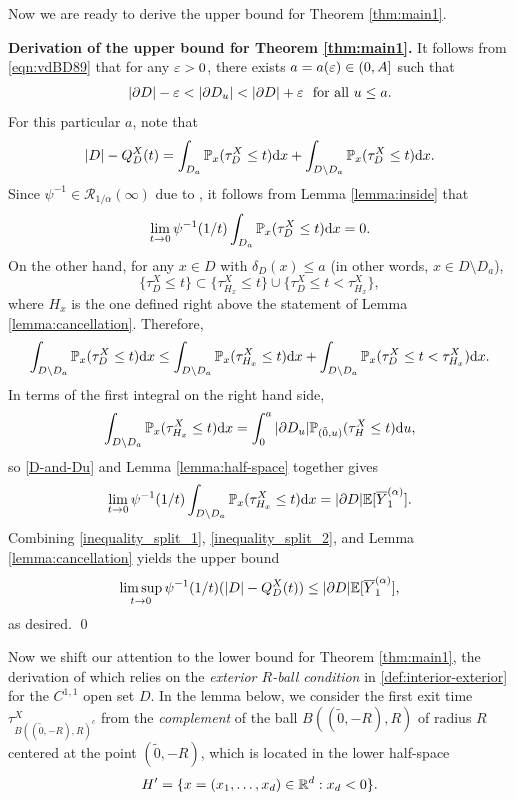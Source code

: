 \documentclass[11pt]{article}
\begin{document}
\begin{doublespace}
Now we are ready to derive the upper bound for Theorem \ref{thm:main1}. \bigskip

\noindent
\textbf{Derivation of the upper bound for Theorem \ref{thm:main1}.}
It follows from \eqref{eqn:vdBD89} that for any $\varepsilon>0$, there exists $a=a(\varepsilon)\in (0,A]$ such that 
\begin{align}\label{D-and-Du}
	|\partial D| - \eps < |\partial D_{u}|<|\partial D| +\eps \ \ \textrm{for all} \ u\leq a.
\end{align}
For this particular $a$, note that
\[
|D|-Q_{D}^{X}(t)=\int_{D_{a}}{\mathbb P}_{x}(\tau_{D}^{X}\leq t)\mathrm{d} x +\int_{D\setminus D_{a}}{\mathbb P}_{x}(\tau_{D}^{X}\leq t)\mathrm{d} x.
\]
Since $\psi^{-1}\in \mathcal{R}_{1/\alpha}(\infty)$ due to \cite[Theorems 1.5.3 and 1.5.12]{BGT}, it follows from Lemma \ref{lemma:inside} that 
\[
\lim_{t\to 0}\psi^{-1}(1/t)\int_{D_{a}}{\mathbb P}_{x}(\tau_{D}^{X}\leq t)\mathrm{d} x=0.
\]
On the other hand, for any $x\in D$ with $\delta_{D}(x)\le a$ (in other words, $x\in D\setminus D_a$), 
\[
\{\tau_{D}^{X}\leq t\}\subset \{\tau^{X}_{H_x}\leq t\} \cup \{\tau_{D}^{X}\leq t <\tau_{H_x}^{X}\},
\]
where $H_x$ is the one defined right above the statement of Lemma \ref{lemma:cancellation}.
Therefore,
\begin{align}\label{inequality_split_1}
\int_{D\setminus D_{a}}{\mathbb P}_{x}(\tau_{D}^{X}\leq t)\mathrm{d} x \leq 
\int_{D\setminus D_{a}}{\mathbb P}_{x}(\tau_{H_x}^{X}\leq t)\mathrm{d} x
+\int_{D\setminus D_{a}}{\mathbb P}_{x}(\tau_{D}^{X}\leq t <\tau_{H_x}^{X})\mathrm{d} x.
\end{align} 
In terms of the first integral on the right hand side, 
\[
	\int_{D\setminus D_{a}}{\mathbb P}_{x}(\tau_{H_x}^{X}\leq t)\mathrm{d} x
	=\int_{0}^{a}|\partial D_{u}|{\mathbb P}_{(\tilde{0}, u)}(\tau_{H}^{X}\leq t)\mathrm{d} u, 
\]
so \eqref{D-and-Du} and Lemma \ref{lemma:half-space} together gives
\begin{align}\label{inequality_split_2}
\lim_{t\to 0}\psi^{-1}(1/t)\int_{D\setminus D_{a}}{\mathbb P}_{x}(\tau_{H_x}^{X}\leq t)\mathrm{d} x=|\partial D|{\mathbb E}[\overline{Y}^{(\alpha)}_{1}].
\end{align}
Combining \eqref{inequality_split_1}, \eqref{inequality_split_2}, and Lemma \ref{lemma:cancellation} yields the upper bound
\[
\limsup_{t\to0}\psi^{-1}(1/t)(|D|-Q_{D}^{X}(t))\leq |\partial D|{\mathbb E}[\overline{Y}^{(\alpha)}_{1}],
\]
as desired.
\qed


Now we shift our attention to the lower bound for Theorem \ref{thm:main1}, the derivation of which relies on the
\textit{exterior $R$-ball condition} in \eqref{def:interior-exterior}
for the $C^{1,1}$ open set $D$. 
In the lemma below, we consider the first exit time $\tau^{X}_{B((\tilde{0},-R),R)^{c}}$ from the \textit{complement} of the ball $B((\tilde{0},-R),R)$ of radius $R$ centered at the point $(\tilde{0},-R)$, which is located in the lower half-space 
\[
	H'=\{x=(x_1,\ldots, x_{d})\in {\mathbb R}^d : x_{d}< 0\}.
\]



\end{doublespace}
\end{document}
